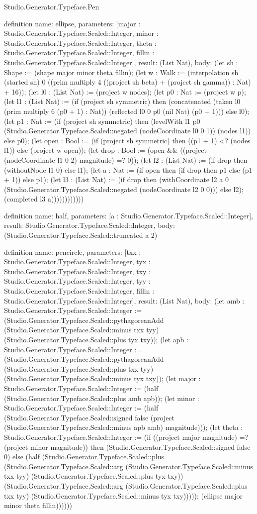 \begin{lexlean}{Studio.Generator.Typeface.Pen}
\begin{semanticmodule}
definition{
  name: ellipse,
  parameters: [major : Studio.Generator.Typeface.Scaled::Integer, minor : Studio.Generator.Typeface.Scaled::Integer, theta : Studio.Generator.Typeface.Scaled::Integer, fillin : Studio.Generator.Typeface.Scaled::Integer],
  result: (List Nat),
  body: (let sh : Shape := (shape major minor theta fillin); (let w : Walk := (interpolation sh (started sh) 0 ((prim multiply 4 ((project sh beta) + (project sh gamma)) : Nat) + 16)); (let l0 : (List Nat) := (project w nodes); (let p0 : Nat := (project w p); (let l1 : (List Nat) := (if (project sh symmetric) then (concatenated (taken l0 (prim multiply 6 (p0 + 1) : Nat)) (reflected l0 0 p0 (nil Nat) (p0 + 1))) else l0); (let p1 : Nat := (if (project sh symmetric) then (levelWith l1 p0 (Studio.Generator.Typeface.Scaled::negated (nodeCoordinate l0 0 1)) (nodes l1)) else p0); (let open : Bool := (if (project sh symmetric) then ((p1 + 1) <? (nodes l1)) else (project w open)); (let drop : Bool := (open && ((project (nodeCoordinate l1 0 2) magnitude) =? 0)); (let l2 : (List Nat) := (if drop then (withoutNode l1 0) else l1); (let a : Nat := (if open then (if drop then p1 else (p1 + 1)) else p1); (let l3 : (List Nat) := (if drop then (withCoordinate l2 a 0 (Studio.Generator.Typeface.Scaled::negated (nodeCoordinate l2 0 0))) else l2); (completed l3 a))))))))))))
}

definition{
  name: half,
  parameters: [a : Studio.Generator.Typeface.Scaled::Integer],
  result: Studio.Generator.Typeface.Scaled::Integer,
  body: (Studio.Generator.Typeface.Scaled::truncated a 2)
}

definition{
  name: pencircle,
  parameters: [txx : Studio.Generator.Typeface.Scaled::Integer, tyx : Studio.Generator.Typeface.Scaled::Integer, txy : Studio.Generator.Typeface.Scaled::Integer, tyy : Studio.Generator.Typeface.Scaled::Integer, fillin : Studio.Generator.Typeface.Scaled::Integer],
  result: (List Nat),
  body: (let amb : Studio.Generator.Typeface.Scaled::Integer := (Studio.Generator.Typeface.Scaled::pythagoreanAdd (Studio.Generator.Typeface.Scaled::minus txx tyy) (Studio.Generator.Typeface.Scaled::plus tyx txy)); (let apb : Studio.Generator.Typeface.Scaled::Integer := (Studio.Generator.Typeface.Scaled::pythagoreanAdd (Studio.Generator.Typeface.Scaled::plus txx tyy) (Studio.Generator.Typeface.Scaled::minus tyx txy)); (let major : Studio.Generator.Typeface.Scaled::Integer := (half (Studio.Generator.Typeface.Scaled::plus amb apb)); (let minor : Studio.Generator.Typeface.Scaled::Integer := (half (Studio.Generator.Typeface.Scaled::signed false (project (Studio.Generator.Typeface.Scaled::minus apb amb) magnitude))); (let theta : Studio.Generator.Typeface.Scaled::Integer := (if ((project major magnitude) =? (project minor magnitude)) then (Studio.Generator.Typeface.Scaled::signed false 0) else (half (Studio.Generator.Typeface.Scaled::plus (Studio.Generator.Typeface.Scaled::arg (Studio.Generator.Typeface.Scaled::minus txx tyy) (Studio.Generator.Typeface.Scaled::plus tyx txy)) (Studio.Generator.Typeface.Scaled::arg (Studio.Generator.Typeface.Scaled::plus txx tyy) (Studio.Generator.Typeface.Scaled::minus tyx txy))))); (ellipse major minor theta fillin))))))
}


\end{semanticmodule}
\end{lexlean}
